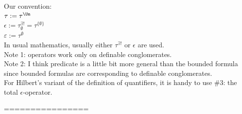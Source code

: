 Our convention:\\
$\tau := \tau^\Un$\\
$\epsilon := \tau^{\exists!}_\emptyset = \tau^{\{\emptyset\}}$\\
$\varepsilon := \tau^\emptyset$\\
In usual mathematics, usually either $\tau^{\exists!}$ or $\epsilon$ are used.\\



Note 1: operators work only on definable conglomerates.\\
Note 2: I think predicate is a little bit more general than the bounded formula since bounded formulas are corresponding to definable conglomerates.\\
 
For Hilbert's variant of the definition of quantifiers, it is handy to use \#3: the total $\epsilon$-operator.
 



================



